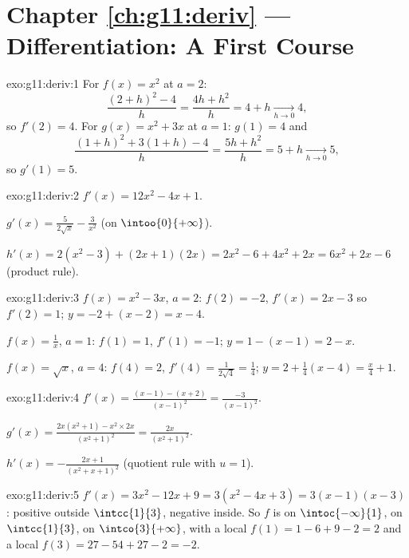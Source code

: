 \section*{Chapter \ref{ch:g11:deriv} --- Differentiation: A First Course}

\begin{solution}{exo:g11:deriv:1}
For $f(x) = x^2$ at $a = 2$:
\[
\frac{(2+h)^2 - 4}{h} = \frac{4h + h^2}{h} = 4 + h
\xrightarrow[h\to0]{} 4,
\]
so $f'(2) = 4$. For $g(x) = x^2 + 3x$ at $a = 1$: $g(1) = 4$ and
\[
\frac{(1+h)^2 + 3(1+h) - 4}{h} = \frac{5h + h^2}{h} = 5 + h
\xrightarrow[h\to0]{} 5,
\]
so $g'(1) = 5$.
\end{solution}

\begin{solution}{exo:g11:deriv:2}
$f'(x) = 12x^2 - 4x + 1$.

$g'(x) = \frac{5}{2\sqrt x} - \frac{3}{x^2}$ (on $\intoo{0}{+\infty}$).

$h'(x) = 2(x^2 - 3) + (2x+1)(2x) = 2x^2 - 6 + 4x^2 + 2x
= 6x^2 + 2x - 6$ (product rule).
\end{solution}

\begin{solution}{exo:g11:deriv:3}
$f(x) = x^2 - 3x$, $a = 2$: $f(2) = -2$, $f'(x) = 2x - 3$ so $f'(2) = 1$;
 $y = -2 + (x - 2) = x - 4$.

$f(x) = \frac1x$, $a = 1$: $f(1) = 1$, $f'(1) = -1$; 
$y = 1 - (x - 1) = 2 - x$.

$f(x) = \sqrt x$, $a = 4$: $f(4) = 2$, $f'(4) = \frac{1}{2\sqrt4} =
\frac14$;  $y = 2 + \frac14(x - 4) = \frac{x}{4} + 1$.
\end{solution}

\begin{solution}{exo:g11:deriv:4}
$f'(x) = \frac{(x-1) - (x+2)}{(x-1)^2} = \frac{-3}{(x-1)^2}$.

$g'(x) = \frac{2x(x^2+1) - x^2 \times 2x}{(x^2+1)^2}
= \frac{2x}{(x^2+1)^2}$.

$h'(x) = -\frac{2x+1}{(x^2+x+1)^2}$ (quotient rule with $u = 1$).
\end{solution}

\begin{solution}{exo:g11:deriv:5}
$f'(x) = 3x^2 - 12x + 9 = 3(x^2 - 4x + 3) = 3(x-1)(x-3)$: positive
outside $\intcc{1}{3}$, negative inside. So $f$ is  on
$\intoc{-\infty}{1}$,  on $\intcc{1}{3}$,  on
$\intco{3}{+\infty}$, with a local  $f(1) = 1 - 6 + 9 - 2 = 2$ and
a local  $f(3) = 27 - 54 + 27 - 2 = -2$.
\end{solution}

